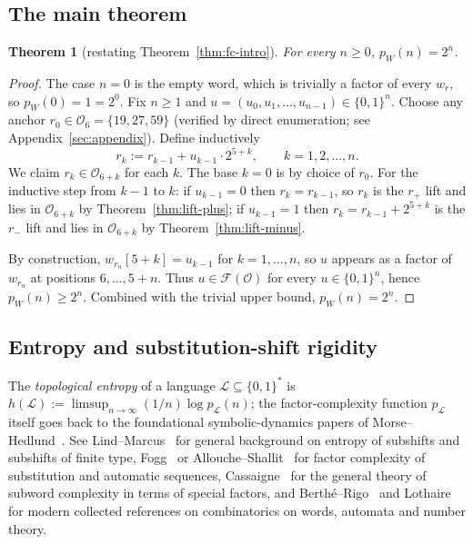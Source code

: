 \documentclass[11pt,reqno]{amsart}
\theoremstyle{plain}
\newtheorem{theorem}{Theorem}[section]
\theoremstyle{definition}
\theoremstyle{remark}
\newcommand{\Obs}{\mathcal{O}}
\newcommand{\Fac}{\mathcal{F}}
\begin{document}
\subsection{The main theorem}

\begin{theorem}[restating Theorem~\ref{thm:fc-intro}]
For every $n \ge 0$, $p_W(n) = 2^n$.
\end{theorem}

\begin{proof}
The case $n = 0$ is the empty word, which is trivially a factor of every
$w_r$, so $p_W(0) = 1 = 2^0$. Fix $n \ge 1$ and
$u = (u_0, u_1, \ldots, u_{n-1}) \in \{0,1\}^n$. Choose
any anchor $r_0 \in \Obs_6 = \{19, 27, 59\}$ (verified by direct enumeration;
see Appendix~\ref{sec:appendix}). Define inductively
\[
r_k := r_{k-1} + u_{k-1} \cdot 2^{5 + k}, \qquad k = 1, 2, \ldots, n.
\]
We claim $r_k \in \Obs_{6+k}$ for each $k$. The base $k = 0$ is by choice of
$r_0$. For the inductive step from $k-1$ to $k$: if $u_{k-1} = 0$ then
$r_k = r_{k-1}$, so $r_k$ is the $r_+$ lift and lies in $\Obs_{6+k}$ by
Theorem~\ref{thm:lift-plus}; if $u_{k-1} = 1$ then $r_k = r_{k-1} + 2^{5+k}$
is the $r_-$ lift and lies in $\Obs_{6+k}$ by Theorem~\ref{thm:lift-minus}.

By construction, $w_{r_n}[5+k] = u_{k-1}$ for $k = 1, \ldots, n$, so $u$
appears as a factor of $w_{r_n}$ at positions $6, \ldots, 5+n$. Thus
$u \in \Fac(\Obs)$ for every $u \in \{0,1\}^n$, hence $p_W(n) \ge 2^n$.
Combined with the trivial upper bound, $p_W(n) = 2^n$. \qedhere
\end{proof}

\subsection{Entropy and substitution-shift rigidity}

The \emph{topological entropy} of a language $\mathcal{L} \subseteq \{0,1\}^*$
is $h(\mathcal{L}) := \limsup_{n \to \infty} (1/n) \log p_{\mathcal{L}}(n)$;
the factor-complexity function $p_{\mathcal{L}}$ itself goes back to the
foundational symbolic-dynamics papers of
Morse--Hedlund~\cite{MorseHedlund1938,MorseHedlund1940}. See
Lind--Marcus~\cite{LindMarcus1995} for general background on entropy of
subshifts and subshifts of finite type, Fogg~\cite{Fogg2002} or
Allouche--Shallit~\cite{AlloucheShallit2003} for factor complexity of
substitution and automatic sequences,
Cassaigne~\cite{Cassaigne1997} for the general theory of subword
complexity in terms of special factors, and
Berth\'e--Rigo~\cite{BertheRigo2010} and Lothaire~\cite{Lothaire2002}
for modern collected references on combinatorics on words, automata
and number theory.
\end{document}
